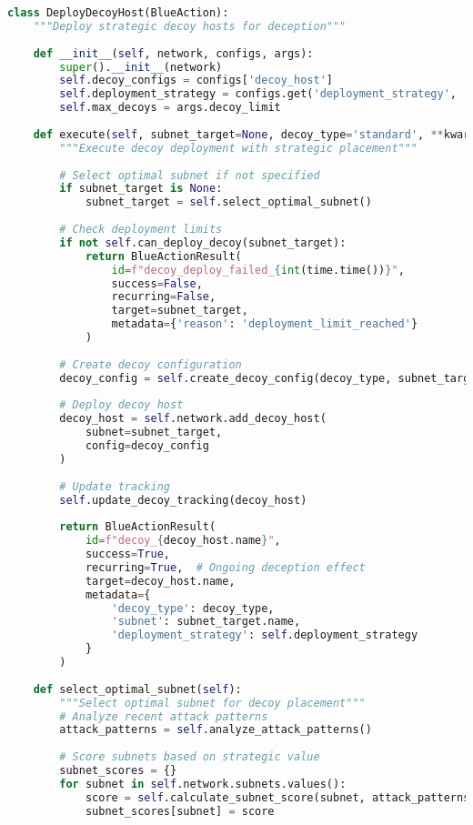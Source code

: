 \documentclass[12pt,a4paper]{article}
\begin{document}
\begin{lstlisting}[language=Python, caption=Blue Action Implementation Example]
class DeployDecoyHost(BlueAction):
    """Deploy strategic decoy hosts for deception"""
    
    def __init__(self, network, configs, args):
        super().__init__(network)
        self.decoy_configs = configs['decoy_host']
        self.deployment_strategy = configs.get('deployment_strategy', 'adaptive')
        self.max_decoys = args.decoy_limit
        
    def execute(self, subnet_target=None, decoy_type='standard', **kwargs):
        """Execute decoy deployment with strategic placement"""
        
        # Select optimal subnet if not specified
        if subnet_target is None:
            subnet_target = self.select_optimal_subnet()
            
        # Check deployment limits
        if not self.can_deploy_decoy(subnet_target):
            return BlueActionResult(
                id=f"decoy_deploy_failed_{int(time.time())}",
                success=False,
                recurring=False,
                target=subnet_target,
                metadata={'reason': 'deployment_limit_reached'}
            )
        
        # Create decoy configuration
        decoy_config = self.create_decoy_config(decoy_type, subnet_target)
        
        # Deploy decoy host
        decoy_host = self.network.add_decoy_host(
            subnet=subnet_target,
            config=decoy_config
        )
        
        # Update tracking
        self.update_decoy_tracking(decoy_host)
        
        return BlueActionResult(
            id=f"decoy_{decoy_host.name}",
            success=True,
            recurring=True,  # Ongoing deception effect
            target=decoy_host.name,
            metadata={
                'decoy_type': decoy_type,
                'subnet': subnet_target.name,
                'deployment_strategy': self.deployment_strategy
            }
        )
    
    def select_optimal_subnet(self):
        """Select optimal subnet for decoy placement"""
        # Analyze recent attack patterns
        attack_patterns = self.analyze_attack_patterns()
        
        # Score subnets based on strategic value
        subnet_scores = {}
        for subnet in self.network.subnets.values():
            score = self.calculate_subnet_score(subnet, attack_patterns)
            subnet_scores[subnet] = score
        

\end{lstlisting}
\end{document}
